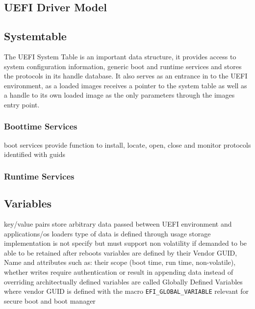 \subsection{\ac{UEFI} Driver Model}


\subsection{Systemtable}
The UEFI System Table is an important data structure, it provides access to system configuration information, generic boot and runtime services and stores the protocols in its handle database\cite[3.3]{tianocore-edk2-driver-writer-s-guide}.
It also serves as an entrance in to the \ac{UEFI} environment, as a loaded images receives a pointer to the system table as well as a handle to its own loaded image as the only parameters through the images entry point.

\subsubsection{Boottime Services}
\cite[2.4 Protocols]{uefi-spec}
boot services provide function to install, locate, open, close and monitor protocols
\cite[7.3 Protocol Handler Services]{uefi-spec}
identified with guids
\subsubsection{Runtime Services}

\subsection{Variables}
key/value pairs
store arbitrary data passed between UEFI environment and applications/os loaders
type of data is defined through usage
storage implementation is not specify but must support non volatility if demanded to be able to be retained after reboots
variables are defined by their Vendor GUID, Name and attributes such as: their scope (boot time, run time, non-volatile), whether writes require authentication or result in appending data instead of overriding
\cite[8.2]{uefi-spec}
architectually defined variables are called Globally Defined Variables where vendor GUID is defined with the macro \lstinline{EFI_GLOBAL_VARIABLE}
\label{sec:uefi-pi:uefi:variables}
\cite[3.3]{uefi-spec}
relevant for secure boot and boot manager

